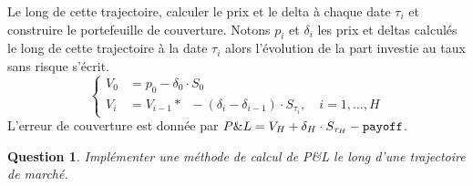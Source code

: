 \documentclass[a4paper,11pt]{article}
\def\expp#1{\mathop {\mathrm{e}^{ #1}}}
\def\var#1{{\tt #1}}
\newtheorem{question}{Question}
\begin{document}
Le long de cette trajectoire, calculer le prix et le delta à chaque date $\tau_i$ et construire le portefeuille de couverture.  Notons $p_i$ et $\delta_i$ les prix et deltas calculés le long de cette trajectoire à la date $\tau_i$ alors l'évolution de la part investie au taux sans risque s'écrit.  \begin{equation*}
  \begin{cases}
    V_0 & = p_0 - \delta_0 \cdot S_0\\
    V_{i} & = V_{i-1} * \expp{\frac{r * T}{H}} -
  (\delta_{i} - \delta_{i-1}) \cdot S_{\tau_{i}}, \quad i=1,\dots,H
\end{cases}
\end{equation*}
L'erreur de couverture est donnée par $P\&L = V_{H} + \delta_H \cdot S_{\tau_H}
- \var{payoff}$.

\begin{question}
  Implémenter une méthode de calcul de P\&L le long d'une trajectoire de marché.
\end{question}




\end{document}
